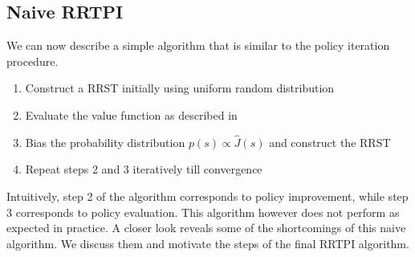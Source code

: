 \documentclass[wcp]{jmlr}
\begin{document}
\subsection*{Naive RRTPI}
We can now describe a simple algorithm that is similar to the policy iteration procedure.\\
\begin{enumerate}
\item Construct a RRST initially using uniform random distribution
\item Evaluate the value function as described in 
\item Bias the probability distribution $p(s) \varpropto \hat{J}(s)$  and construct the RRST
\item Repeat steps 2 and 3 iteratively till convergence
\end{enumerate}
Intuitively, step 2 of the algorithm corresponds to policy improvement, while step 3 corresponds to policy evaluation. This algorithm however does not perform as expected in practice. A closer look reveals some of the shortcomings of this naive algorithm. We discuss them and motivate the steps of the final RRTPI algorithm.
\end{document}
